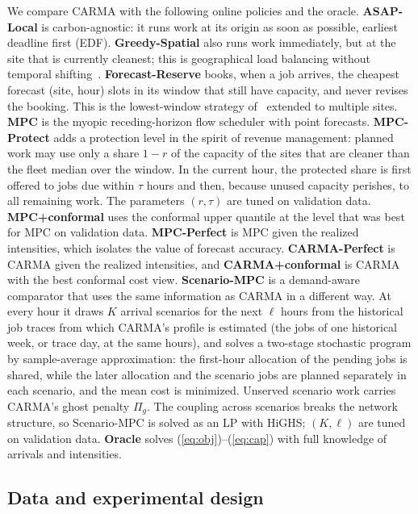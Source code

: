 We compare CARMA with the following online policies and the oracle. \textbf{ASAP-Local} is carbon-agnostic: it runs work at its origin as soon as possible, earliest deadline first (EDF). \textbf{Greedy-Spatial} also runs work immediately, but at the site that is currently cleanest; this is geographical load balancing without temporal shifting~\cite{liu2011greening}. \textbf{Forecast-Reserve} books, when a job arrives, the cheapest forecast (site, hour) slots in its window that still have capacity, and never revises the booking. This is the lowest-window strategy of~\cite{wiesner2021lets} extended to multiple sites. \textbf{MPC} is the myopic receding-horizon flow scheduler with point forecasts. \textbf{MPC-Protect} adds a protection level in the spirit of revenue management: planned work may use only a share $1-r$ of the capacity of the sites that are cleaner than the fleet median over the window. In the current hour, the protected share is first offered to jobs due within $\tau$ hours and then, because unused capacity perishes, to all remaining work. The parameters $(r,\tau)$ are tuned on validation data. \textbf{MPC+conformal} uses the conformal upper quantile at the level that was best for MPC on validation data. \textbf{MPC-Perfect} is MPC given the realized intensities, which isolates the value of forecast accuracy. \textbf{CARMA-Perfect} is CARMA given the realized intensities, and \textbf{CARMA+conformal} is CARMA with the best conformal cost view. \textbf{Scenario-MPC} is a demand-aware comparator that uses the same information as CARMA in a different way. At every hour it draws $K$ arrival scenarios for the next $\ell$ hours from the historical job traces from which CARMA's profile is estimated (the jobs of one historical week, or trace day, at the same hours), and solves a two-stage stochastic program by sample-average approximation: the first-hour allocation of the pending jobs is shared, while the later allocation and the scenario jobs are planned separately in each scenario, and the mean cost is minimized. Unserved scenario work carries CARMA's ghost penalty $\Pi_g$. The coupling across scenarios breaks the network structure, so Scenario-MPC is solved as an LP with HiGHS; $(K,\ell)$ are tuned on validation data. \textbf{Oracle} solves (\ref{eq:obj})--(\ref{eq:cap}) with full knowledge of arrivals and intensities.

\subsection{Data and experimental design}\label{sec:data}

